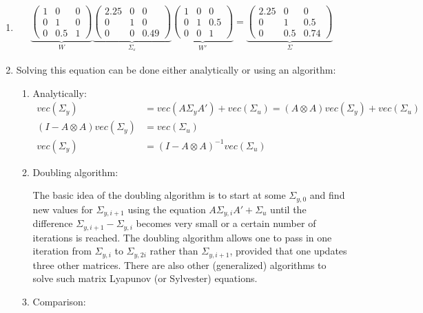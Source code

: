 \begin{enumerate}
\item

\begin{align*}
\underbrace{\begin{pmatrix}1&0&0\\0&1&0\\0&0.5&1\end{pmatrix}}_W
\underbrace{\begin{pmatrix}2.25&0&0\\0&1&0\\0&0&0.49\end{pmatrix}}_{\Sigma_\varepsilon}
\underbrace{\begin{pmatrix}1&0&0\\0&1&0.5\\0&0&1\end{pmatrix}}_{W'}
=
\underbrace{\begin{pmatrix}2.25&0&0\\0&1&0.5\\0&0.5&0.74\end{pmatrix}}_{\Sigma}
\end{align*}

\item
Solving this equation can be done either analytically or using an algorithm:

\begin{enumerate}

\item
Analytically:
\begin{align*}
vec(\Sigma_y) &= vec(A \Sigma_y A') + vec(\Sigma_u) = (A \otimes A)vec(\Sigma_y) + vec(\Sigma_u)
\\
(I-A\otimes A)vec(\Sigma_y) &= vec(\Sigma_u)
\\
vec(\Sigma_y) &= {(I-A\otimes A)}^{-1}vec(\Sigma_u)
\end{align*}

\item
Doubling algorithm:

The basic idea of the doubling algorithm is to start at some \(\Sigma_{y,0}\)
  and find new values for \(\Sigma_{y,i+1}\) using the equation \(A \Sigma_{y,i} A' + \Sigma_u\)
  until the difference \(\Sigma_{y,i+1} - \Sigma_{y,i}\) becomes very small
  or a certain number of iterations is reached.
The doubling algorithm allows one to pass in one iteration
  from \(\Sigma_{y,i}\) to \(\Sigma_{y,2i}\) rather than \(\Sigma_{y,i+1}\),
  provided that one updates three other matrices.
There are also other (generalized) algorithms to solve such matrix Lyapunov (or Sylvester) equations.

\item
Comparison:


\end{enumerate}

\end{enumerate}